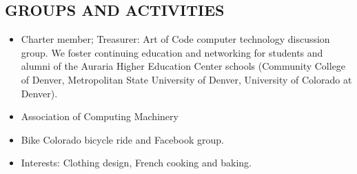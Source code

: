 \documentclass[line,margin]{res}
\begin{document}
\begin{resume}
\section{GROUPS AND ACTIVITIES}        
\begin{itemize}   %
          \item Charter member; Treasurer: Art of Code computer technology discussion group. We foster continuing education and networking for students and alumni of the Auraria Higher Education Center schools (Community College of Denver, Metropolitan State University of Denver, University of Colorado at Denver).
\item	Association of Computing Machinery
\item Bike Colorado bicycle ride and Facebook group.
\item Interests: Clothing design, French cooking and baking.
\end{itemize}
 

\end{resume}
\end{document}

